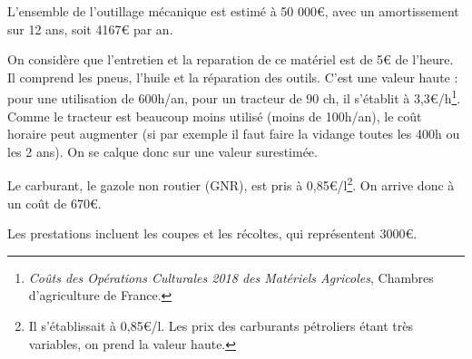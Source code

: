 \documentclass{article}
\begin{document}
L'ensemble de l'outillage mécanique est estimé à 50 000\euro{}, avec un amortissement sur 12 ans, soit 4167\euro{} par an.

On considère que l'entretien et la reparation de ce matériel est de 5\euro{} de l'heure. Il comprend les pneus, l'huile et la réparation des outils. C'est une valeur haute : pour une utilisation de 600h/an, pour un tracteur de 90 ch, il s'établit à 3,3\euro{}/h\footnote{\textit{Coûts des Opérations Culturales 2018 des Matériels Agricoles}, Chambres d'agriculture de France.}. Comme le tracteur est beaucoup moins utilisé (moins de 100h/an), le coût horaire peut augmenter (si par exemple il faut faire la vidange toutes les 400h ou les 2 ans). On se calque donc sur une valeur surestimée.

Le carburant, le gazole non routier (GNR), est pris à 0,85\euro{}/l\footnote{Il s'établissait à 0,85\euro{}/l. Les prix des carburants pétroliers étant très variables, on prend la valeur haute.}. On arrive donc à un coût de 670\euro{}.

Les prestations incluent les coupes et les récoltes, qui représentent 3000\euro{}.
\end{document}
